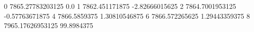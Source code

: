 0 7865.27783203125 0.0
1 7862.451171875 -2.82666015625
2 7864.7001953125 -0.57763671875
4 7866.5859375 1.30810546875
6 7866.572265625 1.29443359375
8 7965.17626953125 99.8984375
